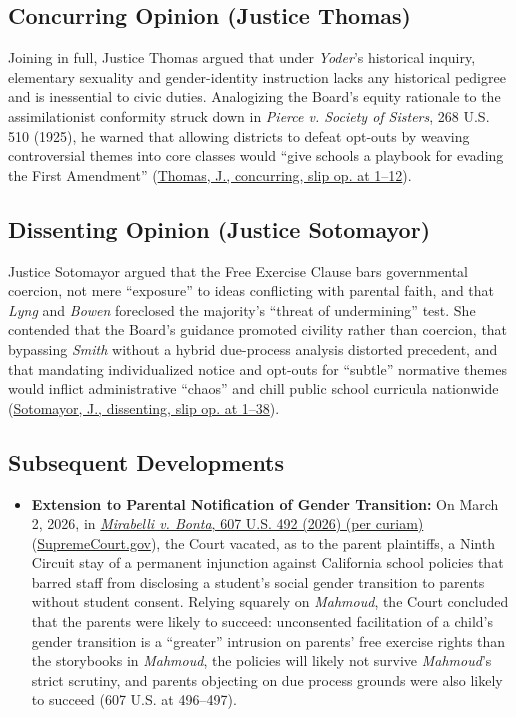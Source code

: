 \documentclass[12pt]{article}
\begin{document}
\subsection{Concurring Opinion (Justice Thomas)}

Joining in full, Justice Thomas argued that under \textit{Yoder}'s historical inquiry, elementary sexuality and gender-identity instruction lacks any historical pedigree and is inessential to civic duties. Analogizing the Board's equity rationale to the assimilationist conformity struck down in \textit{Pierce v. Society of Sisters}, 268 U.S. 510 (1925), he warned that allowing districts to defeat opt-outs by weaving controversial themes into core classes would ``give schools a playbook for evading the First Amendment'' (\href{https://www.law.cornell.edu/supremecourt/text/24-297}{Thomas, J., concurring, slip op. at 1--12}).

\subsection{Dissenting Opinion (Justice Sotomayor)}

Justice Sotomayor argued that the Free Exercise Clause bars governmental coercion, not mere ``exposure'' to ideas conflicting with parental faith, and that \textit{Lyng} and \textit{Bowen} foreclosed the majority's ``threat of undermining'' test. She contended that the Board's guidance promoted civility rather than coercion, that bypassing \textit{Smith} without a hybrid due-process analysis distorted precedent, and that mandating individualized notice and opt-outs for ``subtle'' normative themes would inflict administrative ``chaos'' and chill public school curricula nationwide (\href{https://www.law.cornell.edu/supremecourt/text/24-297}{Sotomayor, J., dissenting, slip op. at 1--38}).

\subsection{Subsequent Developments}

\begin{itemize}

\item \textbf{Extension to Parental Notification of Gender Transition:} On March 2, 2026, in \href{https://www.law.cornell.edu/supremecourt/text/25A810}{\textit{Mirabelli v. Bonta}, 607 U.S. 492 (2026) (per curiam)} (\href{https://www.supremecourt.gov/opinions/25pdf/607us2r17_bqmc.pdf}{SupremeCourt.gov}), the Court vacated, as to the parent plaintiffs, a Ninth Circuit stay of a permanent injunction against California school policies that barred staff from disclosing a student's social gender transition to parents without student consent. Relying squarely on \textit{Mahmoud}, the Court concluded that the parents were likely to succeed: unconsented facilitation of a child's gender transition is a ``greater'' intrusion on parents' free exercise rights than the storybooks in \textit{Mahmoud}, the policies will likely not survive \textit{Mahmoud}'s strict scrutiny, and parents objecting on due process grounds were also likely to succeed (607 U.S. at 496--497).

\end{itemize}
\end{document}
